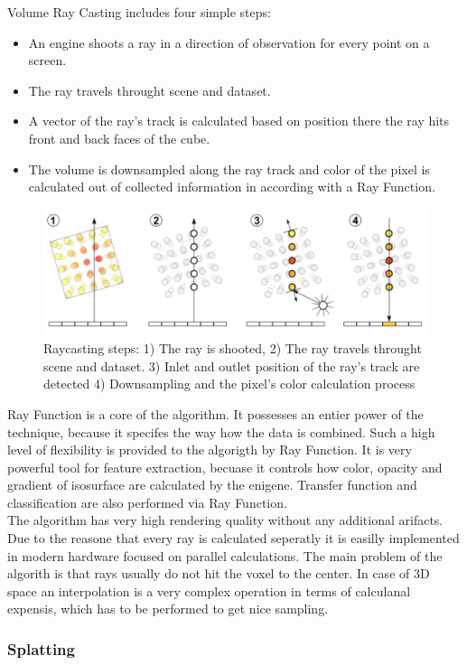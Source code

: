 \documentclass[twoside, english, 11pt]{report}
\begin{document}
Volume Ray Casting includes four simple steps:
\begin{itemize}
\item An engine shoots a ray in a direction of observation for every point on a screen.
\item The ray travels throught scene and dataset.
\item A vector of the ray's track is calculated based on position there the ray hits front and back faces of the cube.
\item The volume is downsampled along the ray track and color of the pixel is calculated out of collected information in according with a Ray Function.
\end{itemize}
\begin{figure}[!h]
\centerline{\includegraphics[scale=0.35]{img/rayCast}}
\caption{Raycasting steps: 1) The ray is shooted, 2) The ray travels throught scene and dataset. 3) Inlet and outlet position of the ray's track are detected 4) Downsampling and the pixel's color calculation process}
\end{figure}

Ray Function is a core of the algorithm. It possesses an entier power of the technique, because it specifes the way how the data is combined. Such a high level of flexibility is provided to the algorigth by Ray Function. It is very powerful tool for feature extraction, becuase it controls how color, opacity and gradient of isosurface are calculated by the enigene. Transfer function and classification are also performed via Ray Function.\\

The algorithm has very high rendering quality without any additional arifacts. Due to the reasone that every ray is calculated seperatly it is easilly implemented in modern hardware focused on parallel calculations. The main problem of the algorith is that rays usually do not hit the voxel to the center. In case of 3D space an interpolation is a very complex operation in terms of calculanal expensis, which has to be performed to get nice sampling.
\subsubsection{Splatting}
\end{document}

